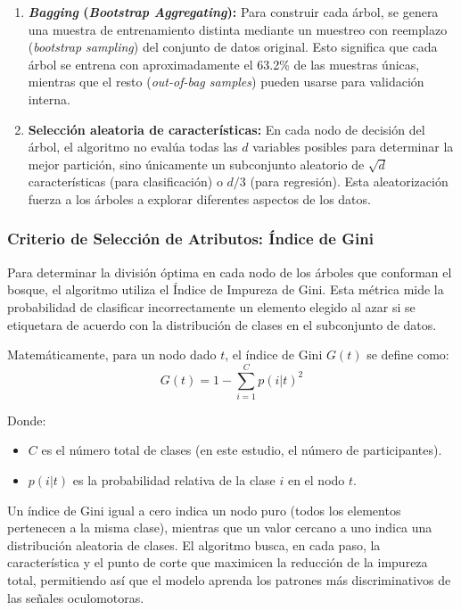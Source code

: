 \begin{enumerate}
	\item \textbf{\textit{Bagging} (\textit{Bootstrap Aggregating}):} Para construir cada árbol, se genera una muestra de entrenamiento distinta mediante un muestreo con reemplazo (\textit{bootstrap sampling}) del conjunto de datos original. Esto significa que cada árbol se entrena con aproximadamente el 63.2\% de las muestras únicas, mientras que el resto (\textit{out-of-bag samples}) pueden usarse para validación interna.
	
	\item \textbf{Selección aleatoria de características:} En cada nodo de decisión del árbol, el algoritmo no evalúa todas las $d$ variables posibles para determinar la mejor partición, sino únicamente un subconjunto aleatorio de $\sqrt{d}$ características (para clasificación) o $d/3$ (para regresión). Esta aleatorización fuerza a los árboles a explorar diferentes aspectos de los datos.
\end{enumerate}


\subsubsection{Criterio de Selección de Atributos: Índice de Gini}

Para determinar la división óptima en cada nodo de los árboles que conforman el bosque, el algoritmo utiliza el Índice de Impureza de Gini. Esta métrica mide la probabilidad de clasificar incorrectamente un elemento elegido al azar si se etiquetara de acuerdo con la distribución de clases en el subconjunto de datos.

Matemáticamente, para un nodo dado $t$, el índice de Gini $G(t)$ se define como:
\begin{equation}
	G(t) = 1 - \sum_{i=1}^{C} p(i|t)^2
\end{equation}

Donde:
\begin{itemize}
	\item $C$ es el número total de clases (en este estudio, el número de participantes).
	\item $p(i|t)$ es la probabilidad relativa de la clase $i$ en el nodo $t$.
\end{itemize}

Un índice de Gini igual a cero indica un nodo puro (todos los elementos pertenecen a la misma clase), mientras que un valor cercano a uno indica una distribución aleatoria de clases. El algoritmo busca, en cada paso, la característica y el punto de corte que maximicen la reducción de la impureza total, permitiendo así que el modelo aprenda los patrones más discriminativos de las señales oculomotoras.

